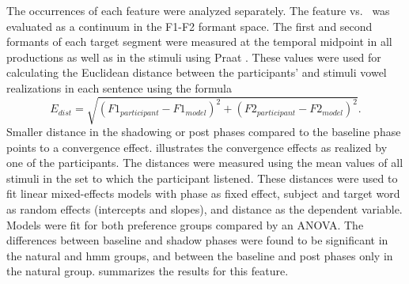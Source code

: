 The occurrences of each feature were analyzed separately.
The feature \textipa{[E:]} vs.\ \textipa{[e:]} was evaluated as a continuum in the F1-F2 formant space.
The first and second formants of each target segment were measured at the temporal midpoint in all productions as well as in the stimuli using Praat \citep{Boersma2018praat}. 
These values were used for calculating the Euclidean distance between the participants' and stimuli vowel realizations in each sentence using the formula
%
\begin{equation}
	E_{dist}=\sqrt{(F1_{participant}-F1_{model})^2+(F2_{participant}-F2_{model})^2}.
\end{equation}
\noindent
%
Smaller distance in the shadowing or post phases compared to the baseline phase points to a convergence effect.
 illustrates the convergence effects as realized by one of the participants.
The distances were measured using the mean values of all stimuli in the set to which the participant listened.
These distances were used to fit linear mixed-effects models with phase as fixed effect, subject and target word as random effects (intercepts and slopes), and distance as the dependent variable.
Models were fit for both preference groups compared by an ANOVA.
The differences between baseline and shadow phases were found to be significant in the natural and \ac{hmm} groups, and between the baseline and post phases only in the natural group.
 summarizes the results for this feature.
%
